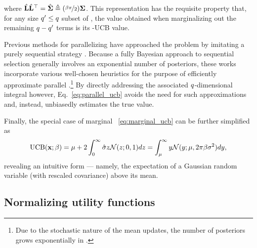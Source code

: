 where \(\hat{\mathbf{L}}\hat{\mathbf{L}}^\top = \hat{\boldsymbol{\Sigma}} \triangleq (\nicefrac{\beta\pi}{2})\boldsymbol{\Sigma}\). This representation has the requisite property that, for any size \(q^\prime \le q\) subset of \X, the value obtained when marginalizing out the remaining \(q - q^\prime\) terms is its \alt{\parallelism}-UCB value.

Previous methods for parallelizing \UCB{} have approached the problem by imitating a purely sequential strategy \cite{contal2013parallel,desautels2014parallelizing}. Because a fully Bayesian approach to sequential selection generally involves an exponential number of posteriors, these works incorporate various well-chosen heuristics for the purpose of efficiently approximate parallel \UCB{}.\footnote{Due to the stochastic nature of the mean updates, the number of posteriors grows exponentially in \parallelism.} By directly addressing the associated \(q{}\)-dimensional integral however, Eq.~\eqref{eq:parallel_ucb} avoids the need for such approximations and, instead, unbiasedly estimates the true value.

Finally, the special case of marginal \UCB~\eqref{eq:marginal_ucb} can be further simplified as
\begin{align}
\label{eq:mUCB_simple}
\operatorname{UCB}(\mathbf{x}; \beta)
    =\mu + 2\int_{0}^{\infty}\hat{\sigma} z \mathcal{N}(z; 0, 1)dz
    =\int_{\mu}^{\infty} y \mathcal{N}(y; \mu, 2\pi\beta\sigma^{2}) dy,
\end{align}
revealing an intuitive form --- namely, the expectation of a Gaussian random variable (with rescaled covariance) above its mean.
\pagebreak


\subsection{Normalizing utility functions}
\label{appendix:normalizing_utility}

